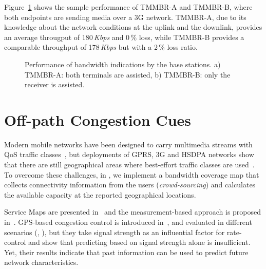 Figure~\ref{fig:tmmbn} shows the sample performance of TMMBR-A and TMMBR-B,
where both endpoints are sending media over a 3G network. TMMBR-A, due to its
knowledge about the network conditions at the uplink and the downlink, provides
an average througput of 180\,\emph{Kbps} and 0\,\% loss, while TMMBR-B provides a
comparable throughput of 178\,\emph{Kbps} but with a 2\,\% loss ratio.


\begin{figure}
  \centerline{
  }
  \caption{Performance of bandwidth indications by the base
  stations. a) TMMBR-A: both terminals are assisted, b) TMMBR-B: only the receiver
  is assisted.}
  \label{fig:tmmbn}
\end{figure}


\section{Off-path Congestion Cues}


Modern mobile networks have been designed to carry multimedia streams with QoS
traffic classes~\cite{3gpp.23.107}, but deployments of GPRS, 3G and HSDPA
networks show that there are still geographical areas where best-effort
traffic classes are used~\cite{Curcio:glass, 6012045}. To overcome these challenges, in
, we implement a bandwidth coverage map that collects
connectivity information from the users (\emph {crowd-sourcing}) and
calculates the available capacity at the reported geographical locations.

Service Maps are presented in~\cite{1630563} and the measurement-based
approach is proposed in~\cite{Aravinda:2008p14}. GPS-based congestion control
is introduced in~\cite{Yao:2008p21}, and evaluated in different
scenarios (\cite{Yao:2009p57}, \cite{Yao:2010p64}), but they take signal
strength as an influential factor for rate-control and show that predicting
based on signal strength alone is insufficient. Yet, their results indicate
that past information can be used to predict future network characteristics.

